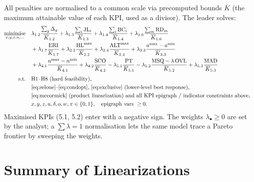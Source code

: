 \documentclass[12pt, letterpaper]{article}
\DeclareMathOperator*{\minimise}{minimise}
\begin{document}
All penalties are normalised to a common scale via precomputed bounds
$\overline{K}$ (the maximum attainable value of each KPI, used as a
divisor). The leader solves:
\begin{align}
\minimise_{x,y,z,u,\dots}\quad
& \lambda_{1.2}\frac{\sum_g\Delta_g}{\overline{K}_{1.2}}
+ \lambda_{1.3}\frac{\sum_i\mathrm{JL}_i}{\overline{K}_{1.3}}
+ \lambda_{1.4}\frac{\sum_i\mathrm{BC}_i}{\overline{K}_{1.4}}
+ \lambda_{1.6}\frac{\sum_m\mathrm{RD}_m}{\overline{K}_{1.6}}
\notag\\
& + \lambda_{1.7}\frac{\mathrm{ERI}}{\overline{K}_{1.7}}
+ \lambda_{2.2}\frac{\mathrm{HL}^{\max}}{\overline{K}_{2.2}}
+ \lambda_{2.4}\frac{\mathrm{ALT}^{\max}}{\overline{K}_{2.4}}
+ \lambda_{3.3}\frac{a^{\max}-a^{\min}}{\overline{K}_{3.3}}
\notag\\
& + \lambda_{4.1}\frac{n^{\max}-n^{\min}}{\overline{K}_{4.1}}
+ \lambda_{4.2}\frac{\mathrm{SCO}}{\overline{K}_{4.2}}
- \lambda_{5.1}\frac{\mathrm{PT}}{\overline{K}_{5.1}}
- \lambda_{5.2}\frac{\mathrm{MSQ}-\lambda\,\mathrm{OVL}}{\overline{K}_{5.2}}
+ \lambda_{5.3}\frac{\mathrm{MAD}}{\overline{K}_{5.3}}
\\[4pt]
\text{s.t.}\quad
& \text{H1--H8 (hard feasibility),}\notag\\
& \text{\eqref{eq:selone}--\eqref{eq:condopt}, \eqref{eq:exclusive} (lower-level best response),}
  \notag\\
& \text{\eqref{eq:mccormick} (product linearization) and all KPI
  epigraph / indicator constraints above,}\notag\\
& x,y,z,u,\delta,o,w,\pi\in\{0,1\},\quad \text{epigraph vars}\ \ge 0.
\notag
\end{align}
Maximised KPIs (5.1, 5.2) enter with a negative sign. The weights
$\lambda_\bullet\ge0$ are set by the analyst; a $\sum\lambda=1$
normalisation lets the same model trace a Pareto frontier by sweeping the
weights.

\section{Summary of Linearizations}
\label{sec:nonlinkpi}
\end{document}
